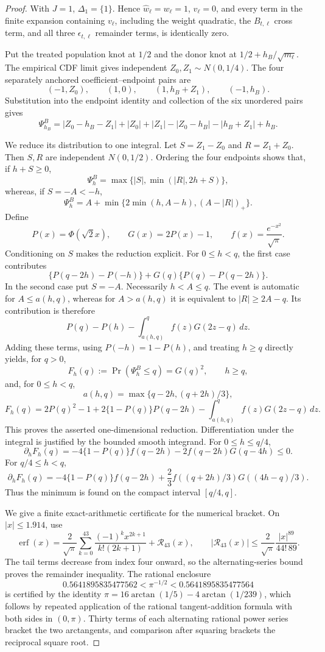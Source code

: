 \documentclass{article}
\begin{document}
\begin{proof}
With \(J=1\), \(\Delta_1=\{1\}\).  Hence \(\widehat w_\ell=w_\ell=1\), \(v_\ell=0\), and every term in the finite expansion containing \(v_\ell\), including the weight quadratic, the \(B_{t,\ell}\) cross term, and all three \(\epsilon_{t,\ell}\) remainder terms, is identically zero.

Put the treated population knot at \(1/2\) and the donor knot at
\(1/2+h_B/\sqrt{m_\ell}\).  The empirical CDF limit gives independent
\(Z_0,Z_1\sim N(0,1/4)\).  The four separately anchored coefficient--endpoint pairs are
\[
 (-1,Z_0),\qquad(1,0),\qquad(1,h_B+Z_1),\qquad(-1,h_B).
\]
Substitution into the endpoint identity and collection of the six unordered pairs gives
\[
 \Psi^B_{h_B}=|Z_0-h_B-Z_1|+|Z_0|+|Z_1|
 -|Z_0-h_B|-|h_B+Z_1|+h_B.
\]

We reduce its distribution to one integral.  Let \(S=Z_1-Z_0\) and
\(R=Z_1+Z_0\).  Then \(S,R\) are independent \(N(0,1/2)\).  Ordering the four endpoints shows that, if \(h+S\geq0\),
\[
 \Psi^B_h=\max\{|S|,\min(|R|,2h+S)\},
\]
whereas, if \(S=-A<-h\),
\[
 \Psi^B_h=A+\min\{2\min(h,A-h),(A-|R|)_+\}.
\]
Define
\[
 P(x)=\Phi(\sqrt2x),\qquad G(x)=2P(x)-1,
 \qquad f(x)=\frac{e^{-x^2}}{\sqrt\pi}.
\]
Conditioning on \(S\) makes the reduction explicit.  For \(0\leq h<q\), the first case contributes
\[
 \{P(q-2h)-P(-h)\}+G(q)\{P(q)-P(q-2h)\}.
\]
In the second case put \(S=-A\).  Necessarily \(h<A\leq q\).  The event is automatic for \(A\leq a(h,q)\), whereas for
\(A>a(h,q)\) it is equivalent to \(|R|\geq2A-q\).  Its contribution is therefore
\[
 P(q)-P(h)-\int_{a(h,q)}^q f(z)G(2z-q)\,dz.
\]
Adding these terms, using \(P(-h)=1-P(h)\), and treating \(h\geq q\) directly yields, for \(q>0\),
\[
 F_h(q):=\Pr(\Psi^B_h\leq q)=G(q)^2,\qquad h\geq q,
\]
and, for \(0\leq h<q\),
\[
 a(h,q)=\max\{q-2h,(q+2h)/3\},
\]
\[
 F_h(q)=2P(q)^2-1+2\{1-P(q)\}P(q-2h)
 -\int_{a(h,q)}^q f(z)G(2z-q)\,dz. \tag{1}
\]
This proves the asserted one-dimensional reduction.  Differentiation under the integral is justified by the bounded smooth integrand.  For \(0\leq h\leq q/4\),
\[
 \partial_hF_h(q)=-4\{1-P(q)\}f(q-2h)
 -2f(q-2h)G(q-4h)\leq0.
\]
For \(q/4\leq h<q\),
\[
 \partial_hF_h(q)=-4\{1-P(q)\}f(q-2h)
 +\frac23f((q+2h)/3)G((4h-q)/3). \tag{2}
\]
Thus the minimum is found on the compact interval \([q/4,q]\).

We give a finite exact-arithmetic certificate for the numerical bracket.  On \(|x|\leq1.914\), use
\[
 \operatorname{erf}(x)=\frac2{\sqrt\pi}
 \sum_{k=0}^{43}\frac{(-1)^kx^{2k+1}}{k!(2k+1)}+\mathcal R_{43}(x),
 \qquad
 |\mathcal R_{43}(x)|\leq
 \frac2{\sqrt\pi}\frac{|x|^{89}}{44!\,89}.
\]
The tail terms decrease from index four onward, so the alternating-series bound proves the remainder inequality.  The rational enclosure
\[
 0.5641895835477562<\pi^{-1/2}<0.5641895835477564
\]
is certified by the identity
\(\pi=16\arctan(1/5)-4\arctan(1/239)\), which follows by repeated application of the rational tangent-addition formula with both sides in \((0,\pi)\).  Thirty terms of each alternating rational power series bracket the two arctangents, and comparison after squaring brackets the reciprocal square root.


\end{proof}
\end{document}
